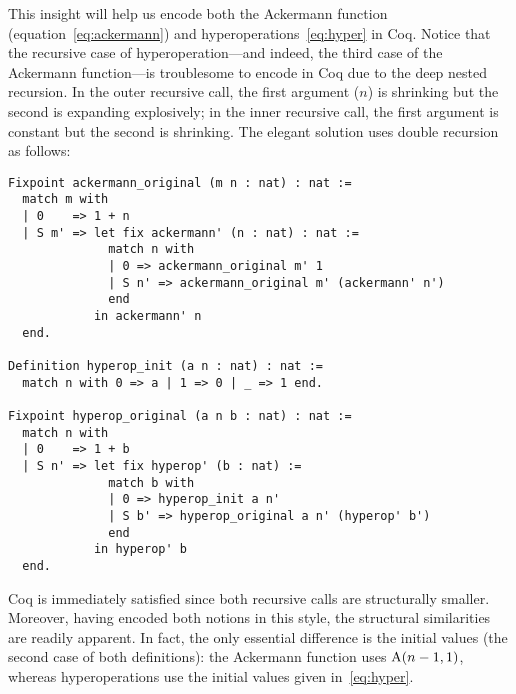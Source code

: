 This insight will help us encode both the Ackermann function (equation~\ref{eq:ackermann}) and hyperoperations~\eqref{eq:hyper} in Coq.  Notice that the recursive case of hyperoperation---and
indeed, the third case of the Ackermann function---is troublesome to encode in Coq due to
the deep nested recursion.  In the outer recursive call, the first argument ($n$) is shrinking 
but the second is expanding explosively; in the inner recursive call, the first argument is 
constant but the second is shrinking. The elegant solution uses double recursion~\cite{someone?} as follows:
\begin{lstlisting}
Fixpoint ackermann_original (m n : nat) : nat :=
  match m with
  | 0    => 1 + n
  | S m' => let fix ackermann' (n : nat) : nat :=
              match n with
              | 0 => ackermann_original m' 1
              | S n' => ackermann_original m' (ackermann' n')
              end
            in ackermann' n
  end.

Definition hyperop_init (a n : nat) : nat :=
  match n with 0 => a | 1 => 0 | _ => 1 end.

Fixpoint hyperop_original (a n b : nat) : nat :=
  match n with
  | 0    => 1 + b
  | S n' => let fix hyperop' (b : nat) :=
              match b with
              | 0 => hyperop_init a n'
              | S b' => hyperop_original a n' (hyperop' b')
              end
            in hyperop' b
  end.
\end{lstlisting}
Coq is immediately satisfied since both recursive calls are structurally smaller.
Moreover, having encoded both notions in this style, the structural similarities 
are readily apparent.  In fact, the only essential difference is the initial values 
(the second case of both definitions): the Ackermann function uses $\text{A}(n-1,1)$, whereas
hyperoperations use the initial values given in~\eqref{eq:hyper}.

